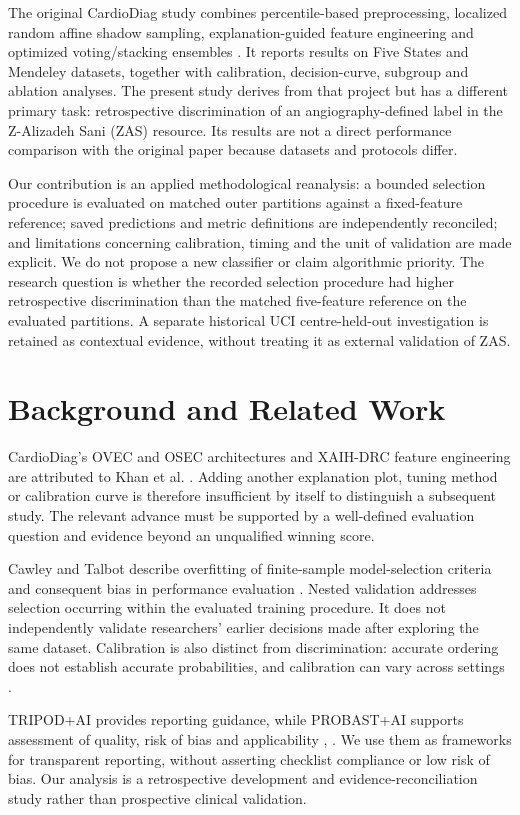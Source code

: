 \documentclass[conference]{IEEEtran}
\begin{document}
The original CardioDiag study combines percentile-based preprocessing, localized random affine shadow sampling, explanation-guided feature engineering and optimized voting/stacking ensembles \cite{r1}. It reports results on Five States and Mendeley datasets, together with calibration, decision-curve, subgroup and ablation analyses. The present study derives from that project but has a different primary task: retrospective discrimination of an angiography-defined label in the Z-Alizadeh Sani (ZAS) resource. Its results are not a direct performance comparison with the original paper because datasets and protocols differ.

Our contribution is an applied methodological reanalysis: a bounded selection procedure is evaluated on matched outer partitions against a fixed-feature reference; saved predictions and metric definitions are independently reconciled; and limitations concerning calibration, timing and the unit of validation are made explicit. We do not propose a new classifier or claim algorithmic priority. The research question is whether the recorded selection procedure had higher retrospective discrimination than the matched five-feature reference on the evaluated partitions. A separate historical UCI centre-held-out investigation is retained as contextual evidence, without treating it as external validation of ZAS.

\section{Background and Related Work}
CardioDiag's OVEC and OSEC architectures and XAIH-DRC feature engineering are attributed to Khan et al. \cite{r1}. Adding another explanation plot, tuning method or calibration curve is therefore insufficient by itself to distinguish a subsequent study. The relevant advance must be supported by a well-defined evaluation question and evidence beyond an unqualified winning score.

Cawley and Talbot describe overfitting of finite-sample model-selection criteria and consequent bias in performance evaluation \cite{r2}. Nested validation addresses selection occurring within the evaluated training procedure. It does not independently validate researchers' earlier decisions made after exploring the same dataset. Calibration is also distinct from discrimination: accurate ordering does not establish accurate probabilities, and calibration can vary across settings \cite{r5}.

TRIPOD+AI provides reporting guidance, while PROBAST+AI supports assessment of quality, risk of bias and applicability \cite{r6}, \cite{r7}. We use them as frameworks for transparent reporting, without asserting checklist compliance or low risk of bias. Our analysis is a retrospective development and evidence-reconciliation study rather than prospective clinical validation.
\end{document}
